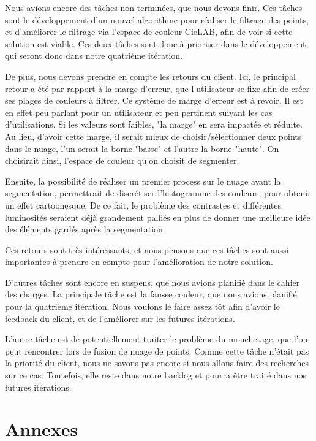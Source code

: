 \documentclass[12pt,titlepage,french]{article}
\begin{document}
Nous avions encore des tâches non terminées, que nous devons finir. Ces tâches sont le développement d'un nouvel algorithme pour réaliser le filtrage des points, et d'améliorer le filtrage via l'espace de couleur CieLAB, afin de voir si cette solution est viable. Ces deux tâches sont donc à prioriser dans le développement, qui seront donc dans notre quatrième itération.

De plus, nous devons prendre en compte les retours du client. Ici, le principal retour a été par rapport à la marge d'erreur, que l'utilisateur se fixe afin de créer ses plages de couleurs à filtrer. Ce système de marge d'erreur est à revoir. Il est en effet peu parlant pour un utilisateur et peu pertinent suivant les cas d'utilisations. Si les valeurs sont faibles, "la marge" en sera impactée et réduite. Au lieu, d'avoir cette marge, il serait mieux de choisir/sélectionner deux points dans le nuage, l'un serait la borne "basse" et l'autre la borne "haute". On choisirait ainsi, l'espace de couleur qu'on choisit de segmenter.

Ensuite, la possibilité de réaliser un premier process sur le nuage avant la segmentation, permettrait de discrétiser l'histogramme des couleurs, pour obtenir un effet cartoonesque. De ce fait, le problème des contrastes et différentes luminosités seraient déjà grandement palliés en plus de donner une meilleure idée des éléments gardés après la segmentation.

Ces retours sont très intéressants, et nous pensons que ces tâches sont aussi importantes à prendre en compte pour l'amélioration de notre solution. \newline

D'autres tâches sont encore en suspens, que nous avions planifié dans le cahier des charges. La principale tâche est la fausse couleur, que nous avions planifié pour la quatrième itération. Nous voulons le faire assez tôt afin d'avoir le feedback du client, et de l'améliorer sur les futures itérations.

L'autre tâche est de potentiellement traiter le problème du mouchetage, que l'on peut rencontrer lors de fusion de nuage de points. Comme cette tâche n'était pas la priorité du client, nous ne savons pas encore si nous allons faire des recherches sur ce cas. Toutefois, elle reste dans notre backlog et pourra être traité dans nos futures itérations.

\newpage
\section{Annexes}
\end{document}
